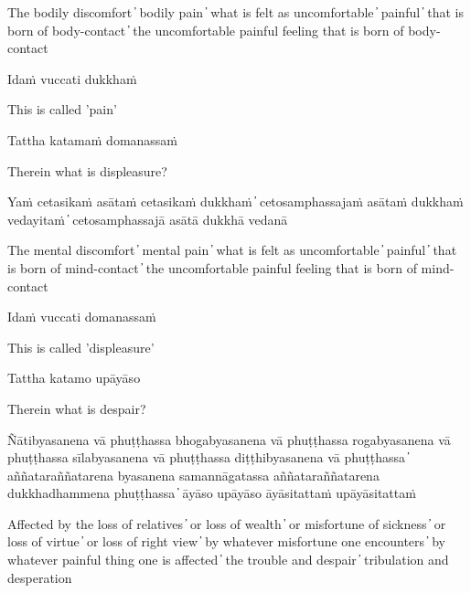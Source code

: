 \begin{cprenglish}
  The bodily discomfort  ̓  bodily pain  ̓  what is felt as uncomfortable  ̓  painful  ̓  that is born of body-contact  ̓  the uncomfortable painful feeling that is born of body-contact
\end{cprenglish}

Idaṁ vuccati dukkhaṁ

\begin{cprenglish}
  This is called 'pain'
\end{cprenglish}

Tattha katamaṁ domanassaṁ

\begin{cprenglish}
  Therein what is displeasure?
\end{cprenglish}

Yaṁ cetasikaṁ asātaṁ cetasikaṁ dukkhaṁ  ̓  cetosamphassajaṁ asātaṁ dukkhaṁ vedayitaṁ  ̓  cetosamphassajā asātā dukkhā vedanā

\begin{cprenglish}
  The mental discomfort  ̓  mental pain  ̓  what is felt as uncomfortable  ̓  painful  ̓  that is born of mind-contact  ̓  the uncomfortable painful feeling that is born of mind-contact
\end{cprenglish}

Idaṁ vuccati domanassaṁ

\begin{cprenglish}
  This is called 'displeasure'
\end{cprenglish}

Tattha katamo upāyāso

\begin{cprenglish}
  Therein what is despair?
\end{cprenglish}

Ñātibyasanena vā phuṭṭhassa bhogabyasanena vā phuṭṭhassa rogabyasanena vā phuṭṭhassa sīlabyasanena vā phuṭṭhassa diṭṭhibyasanena vā phuṭṭhassa  ̓  aññataraññatarena byasanena samannāgatassa aññataraññatarena dukkhadhammena phuṭṭhassa  ̓  āyāso upāyāso āyāsitattaṁ upāyāsitattaṁ

\begin{cprenglish}
  Affected by the loss of relatives  ̓  or loss of wealth  ̓  or misfortune of sickness  ̓  or loss of virtue  ̓  or loss of right view  ̓  by whatever misfortune one encounters  ̓  by whatever painful thing one is affected  ̓  the trouble and despair  ̓  tribulation and desperation
\end{cprenglish}

